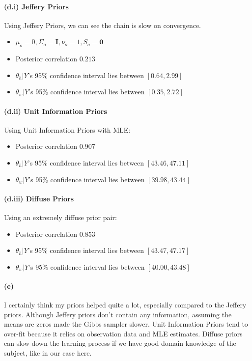 \documentclass[11pt, letterpaper]{article}
\begin{document}
\paragraph{(d.i) Jeffery Priors}
Using Jeffery Priors, we can see the chain is slow on convergence.
\begin{itemize}
    \item $\mu_o=0, \Sigma_o=\mathbf{I}, \nu_o=1, S_o = \mathbf{0}$
    \item Posterior correlation $0.213$
    \item $\theta_h|Y$'s 95\% confidence interval lies between $[0.64, 2.99]$
    \item $\theta_w|Y$'s 95\% confidence interval lies between $[0.35, 2.72]$
\end{itemize}

\paragraph{(d.ii) Unit Information Priors}
Using Unit Information Priors with MLE:
\begin{itemize}
    \item Posterior correlation $0.907$
    \item $\theta_h|Y$'s 95\% confidence interval lies between $[43.46, 47.11]$
    \item $\theta_w|Y$'s 95\% confidence interval lies between $[39.98, 43.44]$
\end{itemize}

\paragraph{(d.iii) Diffuse Priors}
Using an extremely diffuse prior pair:
\begin{itemize}
    \item Posterior correlation $0.853$
    \item $\theta_h|Y$'s 95\% confidence interval lies between $[43.47, 47.17]$
    \item $\theta_w|Y$'s 95\% confidence interval lies between $[40.00, 43.48]$
\end{itemize}

\paragraph{(e)}
I certainly think my priors helped quite a lot, especially compared to the Jeffery priors. Although Jeffery priors don't contain any information, assuming the means are zeros made the Gibbs sampler slower. Unit Information Priors tend to over-fit because
it relies on observation data and MLE estimates. Diffuse priors can slow down the learning process if we have good domain knowledge of the subject, like in our case here.
\end{document}

